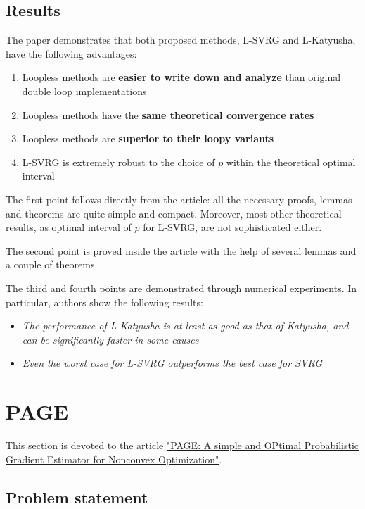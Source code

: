 \documentclass{article}
\begin{document}
\subsection{Results}
The paper demonstrates that both proposed methods,
L-SVRG and L-Katyusha, have the following advantages:
\begin{enumerate}
  \item Loopless methods are  \textbf{easier to write down and analyze}
  than original double loop implementations
  \item Loopless methods have the \textbf{same theoretical convergence rates}
  \item Loopless methods are  \textbf{superior to their loopy variants}
  \item L-SVRG is extremely robust to the choice of \(p\) within the
  theoretical optimal interval
\end{enumerate}

The first point follows directly from the article: all the necessary proofs,
lemmas and theorems are quite simple and compact. Moreover, most other
theoretical results, as optimal interval of \(p\) for L-SVRG, are not
sophisticated either.

The second point is proved inside the article with the help of several lemmas and
a couple of theorems.

The third and fourth points are demonstrated through numerical experiments.
In particular, authors show the following results:
\begin{itemize}
  \item \textit{The performance of L-Katyusha is at least as good as
  that of Katyusha, and can be significantly faster in some causes}
  \item \textit{Even the worst case for L-SVRG outperforms the best case for SVRG}
\end{itemize}

\newpage

\section{PAGE}

This section is devoted to the article
\href{https://proceedings.mlr.press/v139/li21a.html}
{"PAGE: A simple and OPtimal Probabilistic Gradient Estimator for Nonconvex Optimization"}.

\subsection{Problem statement}
\end{document}
